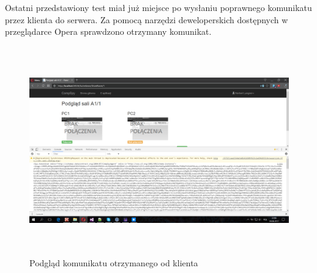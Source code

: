 \newpage
Ostatni przedstawiony test miał już miejsce po wysłaniu poprawnego komunikatu przez klienta do serwera. Za pomocą narzędzi deweloperskich dostępnych w przeglądarce Opera sprawdzono otrzymany komunikat.

\begin{figure} [!ht]
    \centering
    \includegraphics[height=9cm,width=16cm]{comspy_testy9}
    \caption{Podgląd komunikatu otrzymanego od klienta}
    \label{fig:my_label}
\end{figure}